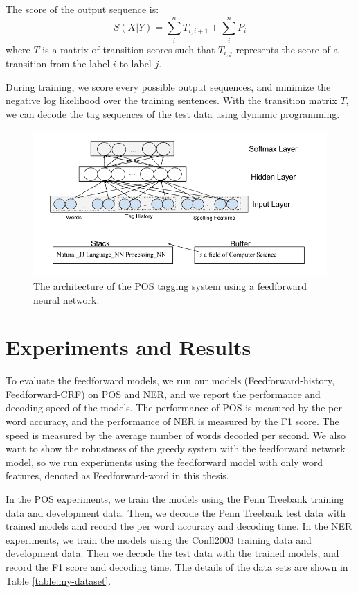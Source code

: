 \documentclass{sfuthesis}
\begin{document}
The score of the output sequence is:
\begin{equation}
S\left( X|Y\right)=\sum _{i}^{n}T_{i,i+1}+\sum _{i}^{n}P_{i}
\end{equation}
where $T$ is a matrix of transition scores such that $T_{i,j}$ represents the score of a transition from the label $i$ to label $j$.

During training, we score every possible output sequences, and minimize the negative log likelihood over the training sentences. With the transition matrix $T$, we can decode the tag sequences of the test data using dynamic programming.



\begin{figure}
  \centering
  \includegraphics[scale=0.6]{greedypos.png}
 \caption{The architecture of the POS tagging system using a feedforward neural network.}
  \label{fig:greedypos}
\end{figure}


\section{Experiments and Results}
To evaluate the feedforward models, we run our models (Feedforward-history, Feedforward-CRF) on POS and NER, and we report the performance and decoding speed of the models. The performance of POS is measured by the per word accuracy, and the performance of NER is measured by the F1 score. The speed is measured by the average number of words decoded per second. We also want to show the robustness of the greedy system with the feedforward network model, so we run experiments using the feedforward model with only word features, denoted as Feedforward-word in this thesis. 

In the POS experiments, we train the models using the Penn Treebank training data and development data. Then, we decode the Penn Treebank test data with trained models and record the per word accuracy and decoding time. In the NER experiments, we train the models uisng the Conll2003 training data and development data. Then we decode the test data with the trained models, and record the F1 score and decoding time. The details of the data sets are shown in Table \ref{table:my-dataset}.
\end{document}
